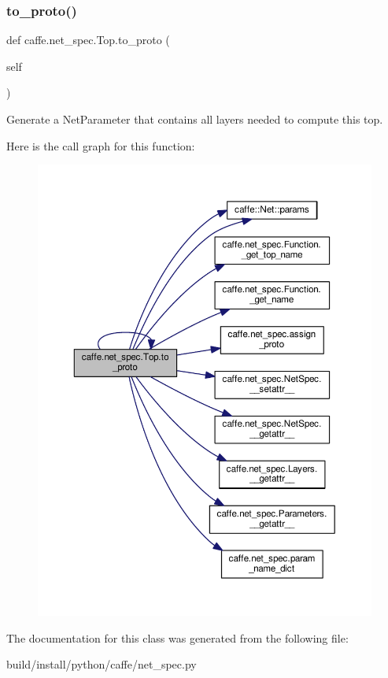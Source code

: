 \subsubsection{\texorpdfstring{to\+\_\+proto()}{to\_proto()}\hspace{0.1cm}{\footnotesize\ttfamily [2/2]}}
{\footnotesize\ttfamily def caffe.\+net\+\_\+spec.\+Top.\+to\+\_\+proto (\begin{DoxyParamCaption}\item[{}]{self }\end{DoxyParamCaption})}

\begin{DoxyVerb}Generate a NetParameter that contains all layers needed to compute
this top.\end{DoxyVerb}
 Here is the call graph for this function\+:
\nopagebreak
\begin{figure}[H]
\begin{center}
\leavevmode
\includegraphics[width=350pt]{classcaffe_1_1net__spec_1_1_top_a90b516f1772cd633670ec8c06118ad49_cgraph}
\end{center}
\end{figure}


The documentation for this class was generated from the following file\+:\begin{DoxyCompactItemize}
\item 
build/install/python/caffe/net\+\_\+spec.\+py\end{DoxyCompactItemize}
